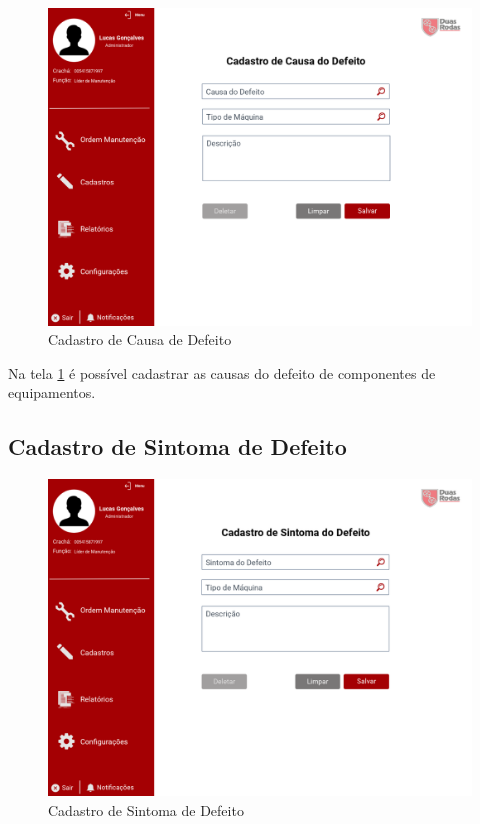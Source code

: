 \begin{figure}[htb]
	\caption{\label{web_cad-causa-defeito}Cadastro de Causa de Defeito}
	\begin{center}
		\includegraphics[scale=0.55]{./Figuras/web/cad-causa-defeito.png}
	\end{center}
\end{figure}

Na tela \ref{web_cad-causa-defeito} é possível cadastrar as causas do defeito de componentes de equipamentos.

\newpage
	\subsection{Cadastro de Sintoma de Defeito}

\begin{figure}[htb]
	\caption{\label{web_cad-sintoma-defeito}Cadastro de Sintoma de Defeito}
	\begin{center}
		\includegraphics[scale=0.55]{./Figuras/web/cad-sintoma-defeito.png}
	\end{center}
\end{figure}

